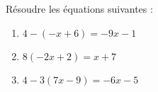 \documentclass[a4paper,11pt,exos]{nsi} %
\begin{document}
\maketitle

\begin{exercice}
    Résoudre les équations suivantes :
    \begin{multicols}{3}
        \begin{enumerate}
            
            \item $4-(-x+6)=-9x-1$
            \item $8(-2x+2)=x+7$
            \item $4-3(7x-9)=-6x-5$
        \end{enumerate}
    \end{multicols}
    
\end{exercice}
\end{document}
